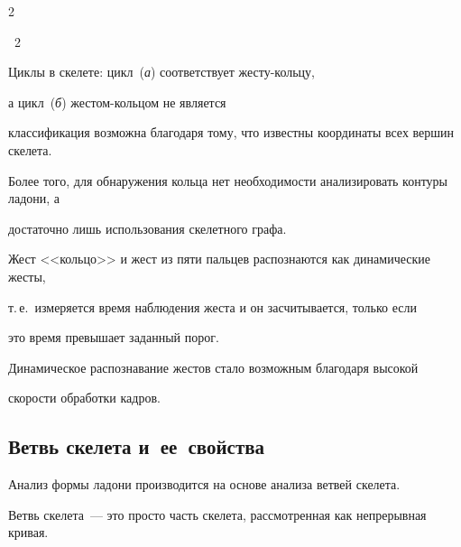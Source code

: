 \begin{multicols}{2}


\vspace*{1pt}


{{\figurename~2}\ \ \small{Циклы в скелете: цикл~(\textit{а}) соответствует жес\-ту-коль\-цу, 


  а цикл~(\textit{б}) жес\-том-коль\-цом не является


}}




\vspace*{9pt}





\smallskip


\addtocounter{figure}{1}








\noindent


 классификация возможна благодаря тому, что известны координаты всех вершин скелета.


Более того, для обнаружения кольца нет необходимости анализировать контуры ладони, а 


достаточно лишь использования скелетного графа.





Жест <<кольцо>> и жест из пяти пальцев распознаются как динамические жесты,


т.\,е.\ измеряется время наблюдения жеста и он засчитывается, только если 


это время превышает заданный порог.


Динамическое распознавание жестов стало возможным благодаря высокой 


скорости обработки кадров.





\subsection{Ветвь скелета и~ее~свойства}\label{seq:GestureRecognition_SkeletonBranch}





Анализ формы ладони производится на основе анализа ветвей скелета.


Ветвь скелета~--- это прос\-то часть скелета, рассмотренная как непрерывная кривая.



\end{multicols}
